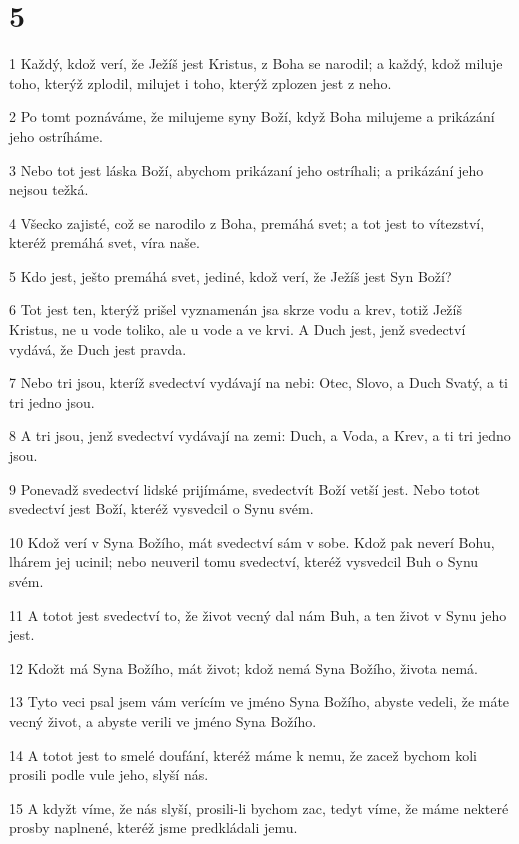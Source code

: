 \chapter{5}

\par 1 Každý, kdož verí, že Ježíš jest Kristus, z Boha se narodil; a každý, kdož miluje toho, kterýž zplodil, milujet i toho, kterýž zplozen jest z neho.
\par 2 Po tomt poznáváme, že milujeme syny Boží, když Boha milujeme a prikázání jeho ostríháme.
\par 3 Nebo tot jest láska Boží, abychom prikázaní jeho ostríhali; a prikázání jeho nejsou težká.
\par 4 Všecko zajisté, což se narodilo z Boha, premáhá svet; a tot jest to vítezství, kteréž premáhá svet, víra naše.
\par 5 Kdo jest, ješto premáhá svet, jediné, kdož verí, že Ježíš jest Syn Boží?
\par 6 Tot jest ten, kterýž prišel vyznamenán jsa skrze vodu a krev, totiž Ježíš Kristus, ne u vode toliko, ale u vode a ve krvi. A Duch jest, jenž svedectví vydává, že Duch jest pravda.
\par 7 Nebo tri jsou, kteríž svedectví vydávají na nebi: Otec, Slovo, a Duch Svatý, a ti tri jedno jsou.
\par 8 A tri jsou, jenž svedectví vydávají na zemi: Duch, a Voda, a Krev, a ti tri jedno jsou.
\par 9 Ponevadž svedectví lidské prijímáme, svedectvít Boží vetší jest. Nebo totot svedectví jest Boží, kteréž vysvedcil o Synu svém.
\par 10 Kdož verí v Syna Božího, mát svedectví sám v sobe. Kdož pak neverí Bohu, lhárem jej ucinil; nebo neuveril tomu svedectví, kteréž vysvedcil Buh o Synu svém.
\par 11 A totot jest svedectví to, že život vecný dal nám Buh, a ten život v Synu jeho jest.
\par 12 Kdožt má Syna Božího, mát život; kdož nemá Syna Božího, života nemá.
\par 13 Tyto veci psal jsem vám verícím ve jméno Syna Božího, abyste vedeli, že máte vecný život, a abyste verili ve jméno Syna Božího.
\par 14 A totot jest to smelé doufání, kteréž máme k nemu, že zacež bychom koli prosili podle vule jeho, slyší nás.
\par 15 A kdyžt víme, že nás slyší, prosili-li bychom zac, tedyt víme, že máme nekteré prosby naplnené, kteréž jsme predkládali jemu.

